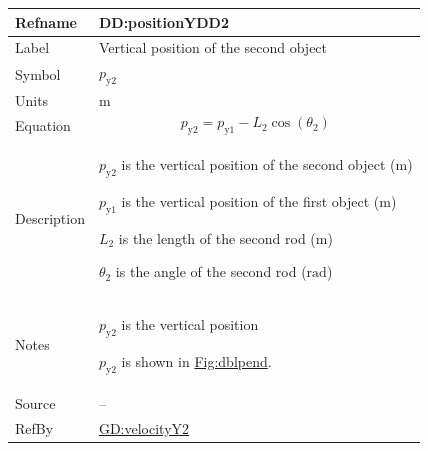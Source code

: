 \documentclass[12pt]{article}
\begin{document}
\vspace{\baselineskip}
\noindent
\begin{minipage}{\textwidth}
\begin{tabular}{>{\raggedright}p{}>{\raggedright\arraybackslash}p{}}
\toprule \textbf{Refname} & \textbf{DD:positionYDD2}
\label{DD:positionYDD2}
\\ \midrule
Label & Vertical position of the second object
        
\\ \midrule
Symbol & ${p_{\text{y}2}}$
         
\\ \midrule
Units & ${\text{m}}$
        
\\ \midrule
Equation & \begin{displaymath}
           {p_{\text{y}2}}={p_{\text{y}1}}-{L_{2}} \cos\left({θ_{2}}\right)
           \end{displaymath}
\\ \midrule
Description & \begin{symbDescription}
              \item{${p_{\text{y}2}}$ is the vertical position of the second object (${\text{m}}$)}
              \item{${p_{\text{y}1}}$ is the vertical position of the first object (${\text{m}}$)}
              \item{${L_{2}}$ is the length of the second rod (${\text{m}}$)}
              \item{${θ_{2}}$ is the angle of the second rod (${\text{rad}}$)}
              \end{symbDescription}
\\ \midrule
Notes & ${p_{\text{y}2}}$ is the vertical position
        
        ${p_{\text{y}2}}$ is shown in \hyperref[Figure:dblpend]{Fig:dblpend}.
        
\\ \midrule
Source & --
         
\\ \midrule
RefBy & \hyperref[GD:velocityY2]{GD:velocityY2}
        
\\ \bottomrule
\end{tabular}
\end{minipage}
\end{document}
